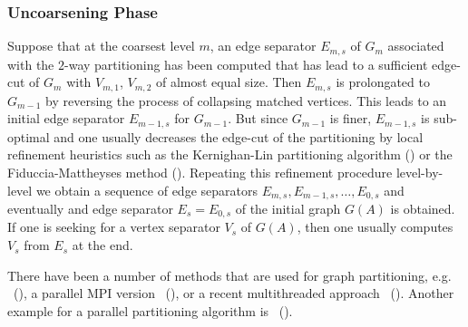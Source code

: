 \subsubsection*{Uncoarsening Phase}
Suppose that at the coarsest level $m$, an edge separator $E_{m,s}$ 
of $G_m$ associated with the  $2$-way partitioning has been computed 
that has lead to a sufficient edge-cut of $G_m$ with $V_{m,1}$, $V_{m,2}$
of almost equal size.
Then $E_{m,s}$ is prolongated to $G_{m-1}$ by reversing the process of
collapsing matched vertices. This leads to an initial edge separator
$E_{m-1,s}$ for $G_{m-1}$. But since $G_{m-1}$ is finer, $E_{m-1,s}$ is 
sub-optimal and one usually decreases the edge-cut of the partitioning
by local refinement heuristics such as the
Kernighan-Lin partitioning algorithm (\cite{KerL70})
or the Fiduccia-Mattheyses method (\cite{FidM97}).
Repeating this refinement procedure level-by-level we obtain a sequence
of edge separators $E_{m,s},E_{m-1,s},\dots,E_{0,s}$ and eventually and
edge separator $E_{s}=E_{0,s}$ of the initial graph $G(A)$ is obtained.
If one is seeking for a vertex separator $V_s$ of $G(A)$, then one usually 
computes $V_s$ from $E_s$ at the end.

There have been a number of methods that are used for graph partitioning,
e.g. \metis{}~(\cite{karypis:98}), a parallel MPI version \parmetis{}~(\cite{KarSK99}),
or a recent multithreaded approach \mtmetis~(\cite{LasK13}).
Another example for a parallel partitioning algorithm is \scotch~(\cite{CheP08}).

